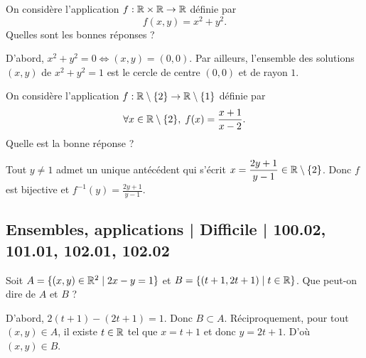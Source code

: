 \begin{question}
On considère l'application $f:\mathbb{R}\times \mathbb{R}\to \mathbb{R}$ définie par
$$f(x,y)=x^2+y^2.$$
Quelles sont les bonnes réponses ?
\begin{answers}  
\end{answers}
\begin{explanations}
D'abord, $x^2+y^2=0\Leftrightarrow (x,y)=(0,0)$. Par ailleurs, l'ensemble des solutions $(x,y)$ de $x^2+y^2=1$ est le cercle de centre $(0,0)$ et de rayon $1$.
\end{explanations}
\end{question}


\begin{question}
On considère l'application $f:\mathbb{R}\setminus\{2\}\to \mathbb{R}\setminus \{1\}$ définie par
$$\forall x\in \mathbb{R}\setminus\{2\},\; f(x)=\frac{x+1}{x-2}.$$
Quelle est la bonne réponse ?
\begin{answers}  
\end{answers}
\begin{explanations}
Tout $y\neq 1$ admet un unique antécédent qui s'écrit $\displaystyle x=\frac{2y+1}{y-1}\in \mathbb{R}\setminus\{2\}$. Donc $f$ est bijective et $\displaystyle f^{-1}(y)=\frac{2y+1}{y-1}$.
\end{explanations}
\end{question}

\subsection{Ensembles, applications | Difficile | 100.02, 101.01, 102.01, 102.02}


\begin{question}
Soit $A=\{(x,y)\in \mathbb{R}^2\mid 2x-y=1\}$ et $B=\{(t+1,2t+1)\mid t\in \mathbb{R}\}$. Que peut-on dire de $A$ et $B$ ?
\begin{answers}  
\end{answers}
\begin{explanations}
D'abord, $2(t+1)-(2t+1)=1$. Donc $B\subset A$. Réciproquement, pour tout $(x,y)\in A$, il existe $t\in \mathbb{R}$ tel que $x=t+1$ et donc $y=2t+1$. D'où $(x,y)\in B$.
\end{explanations}
\end{question}

